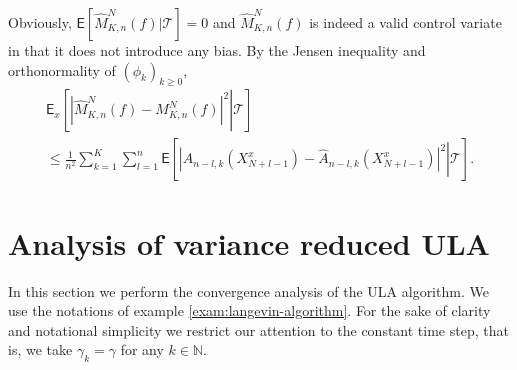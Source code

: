 \documentclass[bj]{imsart}
\def\PE{\mathsf{E}}
\def\nset{\mathbb{N}}
\def\TrainSet{\mathcal{T}}
\begin{document}
Obviously, \(\mathsf{E}[\widehat M_{K,n}^N(f)|\TrainSet]=0\) and \(\widehat M_{K,n}^N(f)\) is indeed a valid control variate in that it
does not introduce any bias. By the Jensen inequality and orthonormality of \((\phi_k)_{k\geq 0},\)
\begin{multline*}
\mathsf{E}_x\left[\left.\left|\widehat{M}_{K,n}^{N}(f)-M_{K,n}^{N}(f)\right|^{2}\right | \TrainSet \right]
\\
\leq \frac{1}{n^2}\sum_{k=1}^{K}\sum_{l=1}^{n}\PE\left[\left.|A_{n-l,k}(X^x_{N+l-1})-\widehat A_{n-l,k}(X^x_{N+l-1})|^2\right | \TrainSet \right].
\end{multline*}

\section{Analysis of variance reduced ULA}
\label{sec:ula_analysis}
In this section we perform the convergence analysis of the ULA algorithm. We use the notations of example \ref{exam:langevin-algorithm}. For the sake of clarity and notational simplicity we restrict our attention to the constant time step, that is, we take $\gamma_k =\gamma$ for any $k \in \nset$.
\end{document}
